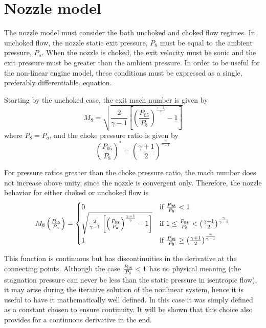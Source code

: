 \documentclass[tcc]{subfiles}
\begin{document}
\section{Nozzle model}
The nozzle model must consider the both unchoked and choked flow regimes. 
In unchoked flow, the nozzle static exit pressure, $P_8$ must be equal to the ambient pressure, $P_a$. 
When the nozzle is choked, the exit velocity must be sonic 
and the exit pressure must be greater than the ambient pressure.
In order to be useful for the non-linear engine model, these conditions must be expressed as a single, preferably differentiable, equation. 

Starting by the unchoked case, the exit mach number is given by
\begin{equation}
    M_8 = \sqrt{\frac{2}{\gamma-1}\left[\left(\frac{P_{05}}{P_8}\right)^{\frac{\gamma-1}{\gamma}}-1\right]}
\end{equation}
where $P_8=P_a$, and the choke pressure ratio is given by
\begin{equation}
    \left(\frac{P_{05}}{P_8}\right)^* = \left(\frac{\gamma+1}{2}\right)^\frac{\gamma}{\gamma-1}
\end{equation}

For pressure ratios greater than the choke pressure ratio, the mach number does not increase above unity, 
since the nozzle is convergent only. Therefore, the nozzle behavior for either choked or unchoked flow is
\begin{equation}
    \label{eqn:M8}
    M_8\left(\tfrac{P_{05}}{P_a}\right) = \begin{cases}
        0 &\text{if $\frac{P_{08}}{P_{8}} < 1$} \\
        \sqrt{\frac{2}{\gamma-1}\left[\left(\frac{P_{08}}{P_a}\right)^{\frac{\gamma-1}{\gamma}}-1\right]} 
        &\text{if $1 \leq \frac{P_{08}}{P_{8}} <\left(\frac{\gamma+1}{2}\right)^\frac{\gamma}{\gamma-1}$} \\
        1 & \text{if $\frac{P_{08}}{P_{8}} \geq \left(\frac{\gamma+1}{2}\right)^\frac{\gamma}{\gamma-1}$ }
    \end{cases}
\end{equation}


This function is continuous but has discontinuities in the derivative at the connecting points. 
Although the case $\frac{P_{08}}{P_{8}}<1$ has no physical meaning 
(the stagnation pressure can never be less than the static pressure in isentropic flow), 
it may arise during the iterative solution of the nonlinear system, 
hence it is useful to have it mathematically well defined. 
In this case it was simply defined as a constant chosen to ensure continuity. It will be shown that this choice also provides for a continuous derivative in the end.
\end{document}
